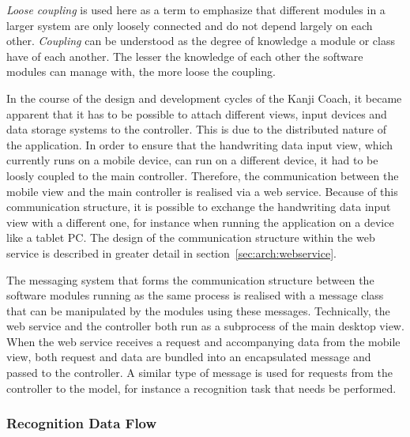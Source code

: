 \emph{Loose coupling} is used here as a term to emphasize that different modules 
in a larger system are only loosely connected and do not depend largely on each 
other. \emph{Coupling} can be understood as the degree of knowledge a module or 
class have of each another. The lesser the knowledge of each other the software 
modules can manage with, the more loose the coupling.

In the course of the design and development cycles of the Kanji Coach, 
it became apparent that it has to be possible to attach different views, 
input devices and data storage systems to the controller. This is due to the 
distributed nature of the application. 
In order to ensure that the handwriting data input view, which currently runs 
on a mobile device, can run on a different device, it had to be loosly coupled 
to the main controller. Therefore, the communication between the mobile view 
and the main controller is realised via a web service. 
Because of this communication structure, it is possible to exchange the 
handwriting data input view with a different one, for instance when running 
the application on a device like a tablet PC. The design of the communication 
structure within the web service is described in greater detail 
in section~\ref{sec:arch:webservice}.

The messaging system that forms the communication structure between the software 
modules running as the same process is realised with a message class that
can be manipulated by the modules using these messages.
Technically, the web service and the controller both run as a subprocess of the 
main desktop view. When the web service receives a request and accompanying data
from the mobile view, both request and data are bundled into an encapsulated
message and passed to the controller. A similar type of message is used for 
requests from the controller to the model, for instance a recognition task that 
needs be performed.

\subsubsection{Recognition Data Flow}
\label{sec:arch:recognitiondataflow}

